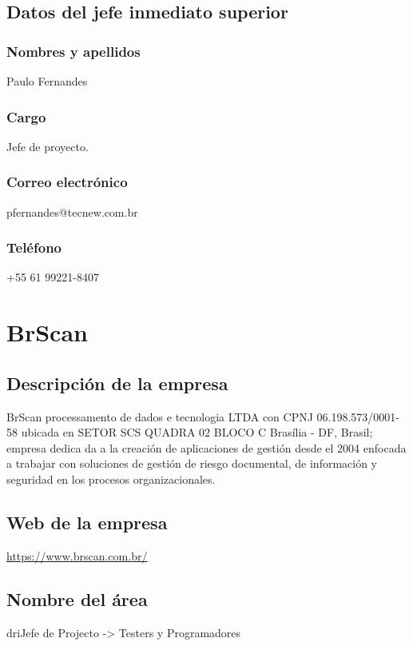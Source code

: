 \subsection{Datos del jefe inmediato superior}

\subsubsection{Nombres y apellidos} 
Paulo Fernandes

\subsubsection{Cargo}
Jefe de proyecto.

\subsubsection{Correo electrónico} 
pfernandes@tecnew.com.br

\subsubsection{Teléfono} 
+55 61 99221-8407


\section{BrScan}

\subsection{Descripción de la empresa}
BrScan processamento de dados e tecnologia LTDA con CPNJ 06.198.573/0001-58 ubicada en SETOR SCS QUADRA 02 BLOCO C Brasília - DF, Brasil; empresa dedica da a la creación de aplicaciones de gestión desde el 2004 enfocada a trabajar con soluciones de gestión de riesgo documental, de información y seguridad en los procesos organizacionales. 


\subsection{Web de la empresa}
\url{https://www.brscan.com.br/}

\subsection{Nombre del área}
driJefe de Projecto -> Testers y Programadores



